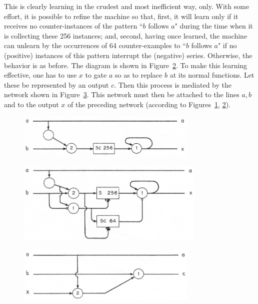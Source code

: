 \documentclass[twocolumn,preprintnumbers,amsmath,amssymb,floatfix]{revtex4}
\begin{document}
This is clearly learning in the crudest and most inefficient way,
only. With some effort, it is possible to refine the machine so
that, first, it will learn only if it receives  no
counter-instances of the pattern ``$b$ follows $a$" during the
time when it is collecting these 256 instances; and, second,
having once learned, the machine can unlearn by the occurrences of
64 counter-examples to ``$b$ follows $a$" if no (positive)
instances of this pattern interrupt the (negative) series.
Otherwise, the behavior is as before. The diagram is shown in
Figure~\ref{fig:23}. To make this learning effective, one has to
use $x$ to gate $a$ so as to replace $b$ at its normal functions.
Let these be represented by an output $c$. Then this process is
mediated by the network shown in Figure~\ref{fig:24}. This network
must then be attached to the lines $a,b$ and to the output $x$ of
the preceding network (according to Figures~\ref{fig:22},
\ref{fig:23}).

\begin{figure}[b]
\includegraphics[width=3.4in]{fig_22}
\caption{\label{fig:22}}
\end{figure}

\begin{figure}[t]
\includegraphics[width=3.55in]{fig_23}
\caption{\label{fig:23}}
\end{figure}

\begin{figure}[b]
\includegraphics[width=3.4in]{fig_24}
\caption{\label{fig:24}}
\end{figure}
\end{document}
